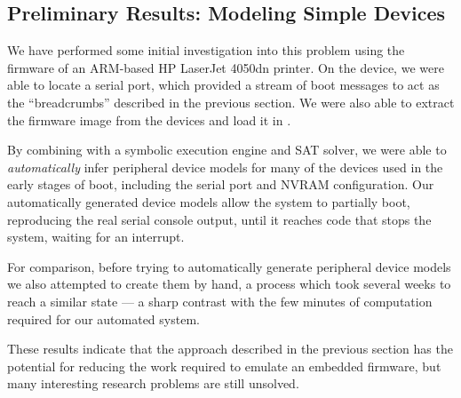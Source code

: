 \subsection{Preliminary Results: Modeling Simple Devices}

We have performed some initial investigation into this problem using the
firmware of an ARM-based HP LaserJet 4050dn printer. On the device, we
were able to locate a serial port, which provided a stream of boot
messages to act as the ``breadcrumbs'' described in the previous
section. We were also able to extract the firmware image from the
devices and load it in \dynamicsys.

By combining \dynamicsys with a symbolic execution engine and SAT
solver, we were able to \emph{automatically} infer peripheral device
models for many of the devices used in the early stages of boot,
including the serial port and NVRAM configuration. Our automatically
generated device models allow the system to partially boot, reproducing
the real serial console output, until it reaches code that stops the
system, waiting for an interrupt.

For comparison, before trying to automatically generate peripheral
device models we also attempted to create them by hand, a process which
took several weeks to reach a similar state --- a sharp contrast with 
the few minutes of computation required for our automated system. 

These results indicate that the approach described in the previous
section has the potential for reducing the work required to emulate an
embedded firmware, but many interesting research problems are still
unsolved.


